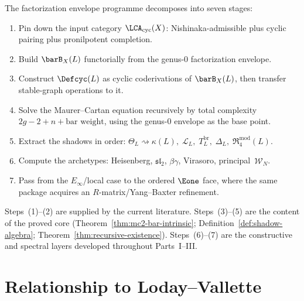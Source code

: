 \begin{remark}
\label{rem:envelope-execution-programme}
The factorization envelope programme decomposes into seven
stages:
\begin{enumerate}[label=\textup{(\arabic*)}]
\item Pin down the input category
  $\LCA_{\mathrm{cyc}}(X)$: Nishinaka-admissible plus
  cyclic pairing plus pronilpotent completion.
\item Build $\barB_X(L)$ functorially from the genus-$0$
  factorization envelope.
\item Construct $\Defcyc(L)$ as cyclic coderivations of
  $\barB_X(L)$, then transfer stable-graph operations
  to it.
\item Solve the Maurer--Cartan equation recursively by
  total complexity $2g - 2 + n + \text{bar weight}$,
  using the genus-$0$ envelope as the base point.
\item Extract the shadows in order:
  $\Theta_L \rightsquigarrow
  \kappa(L),\; \mathcal{L}_L,\;
  T_L^{\mathrm{br}},\; \Delta_L,\;
  \mathfrak{R}_4^{\mathrm{mod}}(L)$.
\item Compute the archetypes:
  Heisenberg, $\widehat{\mathfrak{sl}}_2$,
  $\beta\gamma$, Virasoro,
  principal~$\mathcal{W}_N$.
\item Pass from the $E_\infty$/local case to the ordered
  $\Eone$ face, where the same package acquires an
  $R$-matrix/Yang--Baxter refinement.
\end{enumerate}
Steps~(1)--(2) are supplied by the current literature.
Steps~(3)--(5) are the content of the proved core
(Theorem~\ref{thm:mc2-bar-intrinsic};
Definition~\ref{def:shadow-algebra};
Theorem~\ref{thm:recursive-existence}).
Steps~(6)--(7) are the constructive and spectral layers
developed throughout Parts~I--III.
\end{remark}


\section{Relationship to Loday--Vallette}

